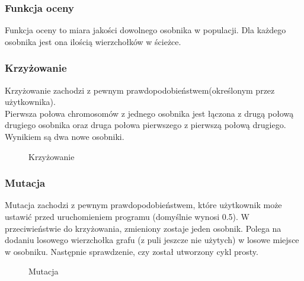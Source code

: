 \documentclass[a4paper,12pt]{article}
\begin{document}
\subsubsection{Funkcja oceny}
Funkcja oceny to miara jakości dowolnego osobnika w populacji. Dla każdego osobnika jest ona ilością wierzchołków w ścieżce.
\subsubsection{Krzyżowanie}
Krzyżowanie zachodzi z pewnym prawdopodobieństwem(określonym przez użytkownika).
\\
Pierwsza połowa chromosomów z jednego osobnika jest łączona z drugą połową drugiego osobnika oraz druga połowa pierwszego z pierwszą połową drugiego. Wynikiem są dwa nowe osobniki. 
\begin{figure}[htbp]
\caption{Krzyżowanie}
\end{figure}
\subsubsection{Mutacja}
Mutacja zachodzi z pewnym prawdopodobieństwem, które użytkownik może ustawić przed uruchomieniem programu (domyślnie wynosi 0.5). W przeciwieństwie do krzyżowania, zmieniony zostaje jeden osobnik. 
Polega na dodaniu losowego wierzchołka grafu (z puli jeszcze nie użytych) w losowe miejsce w osobniku. Następnie sprawdzenie, czy został utworzony cykl prosty.
\begin{figure}[htbp]
\caption{Mutacja}
\end{figure}
\end{document}
